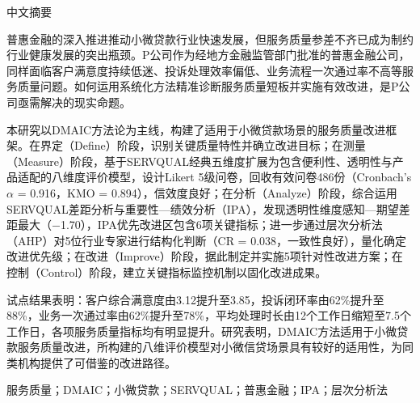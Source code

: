 \centerline{\heiti 中文摘要}

\vspace{1em}

普惠金融的深入推进推动小微贷款行业快速发展，但服务质量参差不齐已成为制约行业健康发展的突出瓶颈。P公司作为经地方金融监管部门批准的普惠金融公司，同样面临客户满意度持续低迷、投诉处理效率偏低、业务流程一次通过率不高等服务质量问题。如何运用系统化方法精准诊断服务质量短板并实施有效改进，是P公司亟需解决的现实命题。

本研究以DMAIC方法论为主线，构建了适用于小微贷款场景的服务质量改进框架。在界定（Define）阶段，识别关键质量特性并确立改进目标；在测量（Measure）阶段，基于SERVQUAL经典五维度扩展为包含便利性、透明性与产品适配的八维度评价模型，设计Likert 5级问卷，回收有效问卷486份（Cronbach's $\alpha$ = 0.916，KMO = 0.894），信效度良好；在分析（Analyze）阶段，综合运用SERVQUAL差距分析与重要性—绩效分析（IPA），发现透明性维度感知—期望差距最大（$-$1.70），IPA优先改进区包含6项关键指标；进一步通过层次分析法（AHP）对5位行业专家进行结构化判断（CR = 0.038，一致性良好），量化确定改进优先级；在改进（Improve）阶段，据此制定并实施5项针对性改进方案；在控制（Control）阶段，建立关键指标监控机制以固化改进成果。

试点结果表明：客户综合满意度由3.12提升至3.85，投诉闭环率由62\%提升至88\%，业务一次通过率由62\%提升至78\%，平均处理时长由12个工作日缩短至7.5个工作日，各项服务质量指标均有明显提升。研究表明，DMAIC方法适用于小微贷款服务质量改进，所构建的八维评价模型对小微信贷场景具有较好的适用性，为同类机构提供了可借鉴的改进路径。

\vspace{1em}
服务质量；DMAIC；小微贷款；SERVQUAL；普惠金融；IPA；层次分析法
